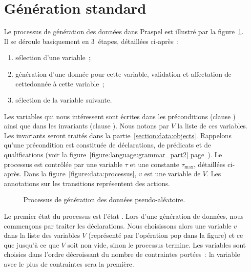 \section{Génération standard}
\label{section:data:random}

Le processus de génération des données dans Praspel est illustré par la
figure~\ref{figure:data:process}. Il se déroule basiquement en 3~étapes,
détaillées ci-après~:
%
\begin{enumerate}

\item sélection d'une variable~;

\item génération d'une donnée pour cette variable, validation et affectation de
cettedonnée à cette variable~;

\item sélection de la variable suivante.

\end{enumerate}

Les variables qui nous intéressent sont écrites dans les préconditions (clause
\arequires) ainsi que dans les invariants (clause \ainvariant). Nous notons par
$V$ la liste de ces variables. Les invariants seront traités dans la
partie~\ref{section:data:objects}. Rappelons qu'une précondition est constituée
de déclarations, de prédicats et de qualifications (voir la
figure~\ref{figure:language:grammar_part2}
page~\pageref{figure:language:grammar_part2}). Le processus est contrôlée par
une variable $\tau$ et une constante $\tau_\mathrm{max}$, détaillées ci-après.
Dans la figure~\ref{figure:data:processus}, $v$ est une variable de $V$. Les
annotations sur les transitions représentent des actions.
%
\begin{figure}


\caption{\label{figure:data:process} Processus de génération des données
pseudo-aléatoire.}

\end{figure}

Le premier état du processus est l'état . Lors d'une génération de
données, nous commençons par traiter les déclarations. Nous choisissons alors
une variable $v$ dans la liste des variables $V$ (représenté par l'opération
$\mathrm{pop}$ dans la figure) et ce que jusqu'à ce que $V$ soit non vide, sinon
le processus termine. Les variables sont choisies dans l'ordre décroissant du
nombre de contraintes portées~: la variable avec le plus de contraintes sera la
première.

